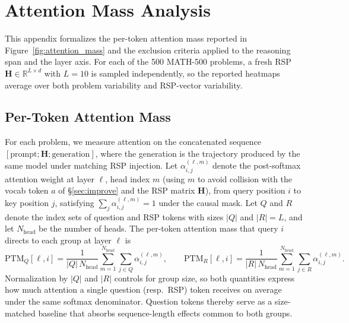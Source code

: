 \section{Attention Mass Analysis}\label{app:attention_mass}

This appendix formalizes the per-token attention mass reported in Figure~\ref{fig:attention_mass} and the exclusion criteria applied to the reasoning span and the layer axis. For each of the 500 MATH-500 problems, a fresh RSP $\mathbf{H} \in \mathbb{R}^{L \times d}$ with $L = 10$ is sampled independently, so the reported heatmaps average over both problem variability and RSP-vector variability.

\subsection{Per-Token Attention Mass}

For each problem, we measure attention on the concatenated sequence $[\text{prompt}; \mathbf{H}; \text{generation}]$, where the generation is the trajectory produced by the same model under matching RSP injection. Let $\alpha^{(\ell, m)}_{i,j}$ denote the post-softmax attention weight at layer $\ell$, head index $m$ (using $m$ to avoid collision with the vocab token $a$ of \S\ref{sec:improve} and the RSP matrix $\mathbf{H}$), from query position $i$ to key position $j$, satisfying $\sum_j \alpha^{(\ell, m)}_{i,j} = 1$ under the causal mask. Let $Q$ and $R$ denote the index sets of question and RSP tokens with sizes $|Q|$ and $|R| = L$, and let $N_{\text{head}}$ be the number of heads. The per-token attention mass that query $i$ directs to each group at layer $\ell$ is
\begin{equation}
\mathrm{PTM}_{Q}[\ell, i] = \frac{1}{|Q|\,N_{\text{head}}} \sum_{m=1}^{N_{\text{head}}} \sum_{j \in Q} \alpha^{(\ell, m)}_{i,j},
\qquad
\mathrm{PTM}_{R}[\ell, i] = \frac{1}{|R|\,N_{\text{head}}} \sum_{m=1}^{N_{\text{head}}} \sum_{j \in R} \alpha^{(\ell, m)}_{i,j}.
\label{eq:per_token_mass}
\end{equation}
Normalization by $|Q|$ and $|R|$ controls for group size, so both quantities express how much attention a single question (resp.\ RSP) token receives on average under the same softmax denominator. Question tokens thereby serve as a size-matched baseline that absorbs sequence-length effects common to both groups.

